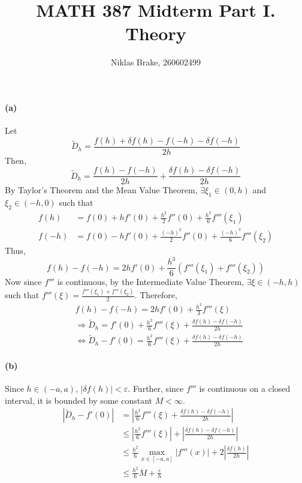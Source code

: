 \documentclass[10pt]{article}
\begin{document}
	
	\title{MATH 387 Midterm Part I. Theory}
	\author{Niklas Brake, 260602499}
	\maketitle
	
	\paragraph{(a)}
	Let $$\tilde{D}_h=\frac{f(h)+\delta f(h)-f(-h)-\delta f(-h)}{2h} $$
	Then, $$\tilde{D}_h=\frac{f(h)-f(-h)}{2h} + \frac{\delta f(h)-\delta f(-h)}{2h}$$
	By Taylor's Theorem and the Mean Value Theorem, $\exists \xi_1 \in (0,h)$ and $\xi_2 \in (-h,0)$ such that
	\begin{align*}
	f(h)&=f(0)+hf'(0)+\frac{h^2}{2}f''(0)+\frac{h^3}{6}f'''(\xi_1) \\
	f(-h)&=f(0)-hf'(0)+\frac{(-h)^2}{2}f''(0)+\frac{(-h)^3}{6}f'''(\xi_2)
	\end{align*}
	Thus,
	$$f(h)-f(-h) = 2hf'(0)+\frac{h^3}{6}\left(f'''(\xi_1)+f'''(\xi_2)\right) $$
	Now since $f'''$ is continuous, by the Intermediate Value Theorem, $\exists \xi \in (-h,h)$ such that $f'''(\xi)=\frac{f'''(\xi_1)+f'''(\xi_2)}{2}$. Therefore,
	\begin{align*}
	&f(h)-f(-h) = 2hf'(0)+\frac{h^3}{3}f'''(\xi) \\
	&\Rightarrow \tilde{D}_h=f'(0)+\frac{h^2}{6}f'''(\xi) + \frac{\delta f(h)-\delta f(-h)}{2h} \\
	&\Leftrightarrow \tilde{D}_h-f'(0)=\frac{h^2}{6}f'''(\xi) + \frac{\delta f(h)-\delta f(-h)}{2h}
	\end{align*}
	
	\paragraph{(b)}
	Since $h\in (-a,a)$, $\left| \delta f(h)\right| <\varepsilon$. Further, since $f'''$ is continuous on a closed interval, it is bounded by some constant $M<\infty$.
	\begin{align*}
	 \left|\tilde{D}_h-f'(0)\right|  &= \left|\frac{h^2}{6}f'''(\xi) + \frac{\delta f(h)-\delta f(-h)}{2h} \right| \\
	   & \le \left|\frac{h^2}{6}f'''(\xi)\right| + \left|\frac{\delta f(h)-\delta f(-h)}{2h}\right|  \\
	    &\le \frac{h^2}{6} \max_{x\in[-a,a]} \left|f'''(x)\right| + 2\left|\frac{\delta f(h)}{2h}\right| \\
	     &\le \frac{h^2}{6}M+\frac{\varepsilon}{h} 
     \end{align*}
     
\end{document}
